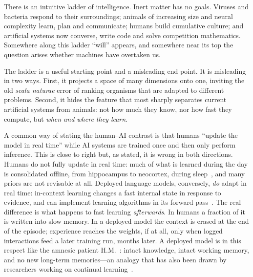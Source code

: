 \documentclass[11pt]{article}
\theoremstyle{plain}
\theoremstyle{definition}
\theoremstyle{remark}
\begin{document}
There is an intuitive ladder of intelligence. Inert matter has no goals. Viruses and bacteria respond to their surroundings; animals of increasing size and neural complexity learn, plan and communicate; humans build cumulative culture; and artificial systems now converse, write code and solve competition mathematics. Somewhere along this ladder ``will'' appears, and somewhere near its top the question arises whether machines have overtaken us.

The ladder is a useful starting point and a misleading end point. It is misleading in two ways. First, it projects a space of many dimensions onto one, inviting the old \emph{scala naturae} error of ranking organisms that are adapted to different problems. Second, it hides the feature that most sharply separates current artificial systems from animals: not how much they know, nor how fast they compute, but \emph{when and where they learn}.

A common way of stating the human--AI contrast is that humans ``update the model in real time'' while AI systems are trained once and then only perform inference. This is close to right but, as stated, it is wrong in both directions. Humans do not fully update in real time: much of what is learned during the day is consolidated offline, from hippocampus to neocortex, during sleep~\citep{mcclelland1995why,diekelmann2010memory}, and many priors are not revisable at all. Deployed language models, conversely, \emph{do} adapt in real time: in-context learning changes a fast internal state in response to evidence, and can implement learning algorithms in its forward pass~\citep{brown2020language,garg2022what,vonoswald2023transformers}. The real difference is what happens to fast learning \emph{afterwards}. In humans a fraction of it is written into slow memory. In a deployed model the context is erased at the end of the episode; experience reaches the weights, if at all, only when logged interactions feed a later training run, months later. A deployed model is in this respect like the amnesic patient H.M.~\citep{scoville1957loss}: intact knowledge, intact working memory, and no new long-term memories---an analogy that has also been drawn by researchers working on continual learning~\citep{behrouz2025nested}.
\end{document}
